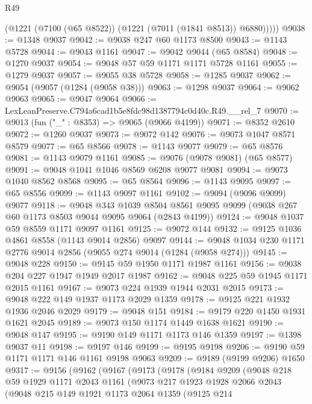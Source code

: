 \begin{lexlean}{R49}
\begin{coremodule}
          (@1221 (@7100 (@65 @8522)) (@1221 (@7011 (@1841 @8513)) @6880)))))
@9038 := @1348 @9037
@9042 := @9038 @247 @60 @1173 @8500
@9043 := @1143 @5728
@9044 := @9043 @1161
@9047 := @9042 @9044 (@65 @8584)
@9048 := @1270 @9037
@9054 := @9048 @57 @59 @1171 @1171 @5728 @1161
@9055 := @1279 @9037
@9057 := @9055 @38 @5728
@9058 := @1285 @9037
@9062 := @9054 (@9057 (@1284 (@9058 @38)))
@9063 := @1298 @9037
@9064 := @9062 @9063
@9065 := @9047 @9064
@9066 := LexLeanPreserve.C794a6cad1b5e8fdc98d1387794c0d40c.R49.__rel_7
@9070 := @9013 (fun ("_" : @8353) => @9065 (@9066 @4199))
@9071 := @8352 @2610
@9072 := @1260 @9037
@9073 := @9072 @142
@9076 := @9073 @1047 @8571 @8579
@9077 := @65 @8566
@9078 := @1143 @9077
@9079 := @65 @8576
@9081 := @1143 @9079 @1161
@9085 := @9076 (@9078 @9081) (@65 @8577)
@9091 := @9048 @1041 @1046 @8569 @6208 @9077 @9081
@9094 := @9073 @1040 @8562 @8568
@9095 := @65 @8564
@9096 := @1143 @9095
@9097 := @65 @8556
@9099 := @1143 @9097 @1161
@9102 := @9094 (@9096 @9099) @9077
@9118 := @9048
    @343
    @1039
    @8504
    @8561
    @9095
    @9099
    (@9038 @267 @60 @1173 @8503 @9044 @9095 @9064 (@2843 @4199))
@9124 := @9048 @1037 @59 @8559 @1171 @9097 @1161
@9125 := @9072 @144
@9132 := @9125 @1036 @4861 @8558 (@1143 @9014 @2856) @9097
@9144 := @9048 @1034 @230 @1171 @2776 @9014 @2856 (@9055 @274 @9014 (@1284 (@9058 @274)))
@9145 := @9048 @228
@9150 := @9145 @59 @1950 @1171 @1987 @1161
@9156 := @9038 @204 @227 @1947 @1949 @2017 @1987
@9162 := @9048 @225 @59 @1945 @1171 @2015 @1161
@9167 := @9073 @224 @1939 @1944 @2031 @2015
@9173 := @9048 @222 @149 @1937 @1173 @2029 @1359
@9178 := @9125 @221 @1932 @1936 @2046 @2029
@9179 := @9048 @151
@9184 := @9179 @220 @1450 @1931 @1621 @2045
@9189 := @9073 @150 @1174 @1449 @1638 @1621
@9190 := @9048 @147
@9195 := @9190 @149 @1171 @1173 @146 @1359
@9197 := @1398 @9037 @11
@9198 := @9197 @146
@9199 := @9195 @9198
@9206 := @9190 @59 @1171 @1171 @146 @1161 @9198 @9063
@9209 := @9189 (@9199 @9206) @1650
@9317 := @9156
    (@9162
      (@9167
        (@9173
          (@9178
            (@9184
              @9209
              (@9048
                @218
                @59
                @1929
                @1171
                @2043
                @1161
                (@9073
                  @217
                  @1923
                  @1928
                  @2066
                  @2043
                  (@9048
                    @215
                    @149
                    @1921
                    @1173
                    @2064
                    @1359
                    (@9125
                      @214

\end{coremodule}
\end{lexlean}
